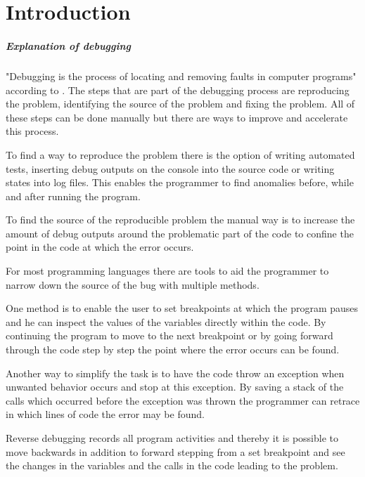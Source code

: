
\chapter{Introduction}\label{cha:Introduction}

\paragraph{Explanation of debugging}
\label{paragraph:debuging}

"Debugging is the process of locating and removing faults in computer programs" according to . The steps that are part of the debugging process are reproducing the problem, identifying the source of the problem and fixing the problem. All of these steps can be done manually but there are ways to improve and accelerate this process.

To find a way to reproduce the problem there is the option of writing automated tests, inserting debug outputs on the console into the source code or writing states into log files. This enables the programmer to find anomalies before, while and after running the program. 

To find the source of the reproducible problem the manual way is to increase the amount of debug outputs around the problematic part of the code to confine the point in the code at which the error occurs.

For most programming languages there are tools to aid the programmer to narrow down the source of the bug with multiple methods.

One method is to enable the user to set breakpoints at which the program pauses and he can inspect the values of the variables directly within the code. By continuing the program to move to the next breakpoint or by going forward through the code step by step the point where the error occurs can be found.

Another way to simplify the task is to have the code throw an exception when unwanted behavior occurs and stop at this exception. By saving a stack of the calls which occurred before the exception was thrown the programmer can retrace in which lines of code the error may be found.

Reverse debugging records all program activities and thereby it is possible to move backwards in addition to forward stepping from a set breakpoint and see the changes in the variables and the calls in the code leading to the problem.

